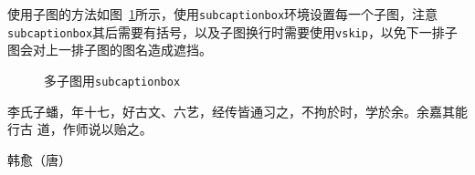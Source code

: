 使用子图的方法如图~\ref{fig:chap2:zitu}所示，使用\texttt{subcaptionbox}环境设置每一个子图，注意\texttt{subcaptionbox}其后需要有括号，以及子图换行时需要使用\texttt{vskip}，以免下一排子图会对上一排子图的图名造成遮挡。
\begin{figure}[htbp]
\centering
\vskip0.5cm
\caption{多子图用\texttt{subcaptionbox}}\label{fig:chap2:zitu}
\end{figure}

李氏子蟠，年十七，好古文、六艺，经传皆通习之，不拘於时，学於余。余嘉其能行古
道，作师说以贻之。

\hfill \pozhehao 韩愈（唐）
